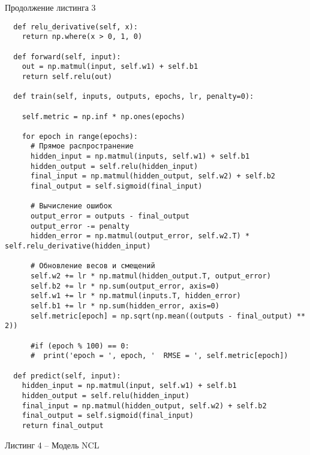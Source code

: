 \documentclass[12pt]{extarticle}
\begin{document}
\newpage %

Продолжение листинга 3
\begin{lstlisting}
  def relu_derivative(self, x):
    return np.where(x > 0, 1, 0)

  def forward(self, input):
    out = np.matmul(input, self.w1) + self.b1
    return self.relu(out)

  def train(self, inputs, outputs, epochs, lr, penalty=0):

    self.metric = np.inf * np.ones(epochs)

    for epoch in range(epochs):
      # Прямое распространение
      hidden_input = np.matmul(inputs, self.w1) + self.b1
      hidden_output = self.relu(hidden_input)
      final_input = np.matmul(hidden_output, self.w2) + self.b2
      final_output = self.sigmoid(final_input)

      # Вычисление ошибок
      output_error = outputs - final_output
      output_error -= penalty
      hidden_error = np.matmul(output_error, self.w2.T) * self.relu_derivative(hidden_input)

      # Обновление весов и смещений
      self.w2 += lr * np.matmul(hidden_output.T, output_error)
      self.b2 += lr * np.sum(output_error, axis=0)
      self.w1 += lr * np.matmul(inputs.T, hidden_error)
      self.b1 += lr * np.sum(hidden_error, axis=0)
      self.metric[epoch] = np.sqrt(np.mean((outputs - final_output) ** 2))

      #if (epoch % 100) == 0:
      #  print('epoch = ', epoch, '  RMSE = ', self.metric[epoch])

  def predict(self, input):
    hidden_input = np.matmul(input, self.w1) + self.b1
    hidden_output = self.relu(hidden_input)
    final_input = np.matmul(hidden_output, self.w2) + self.b2
    final_output = self.sigmoid(final_input)
    return final_output
\end{lstlisting}

\newpage

Листинг 4 -- Модель NCL
\end{document}
